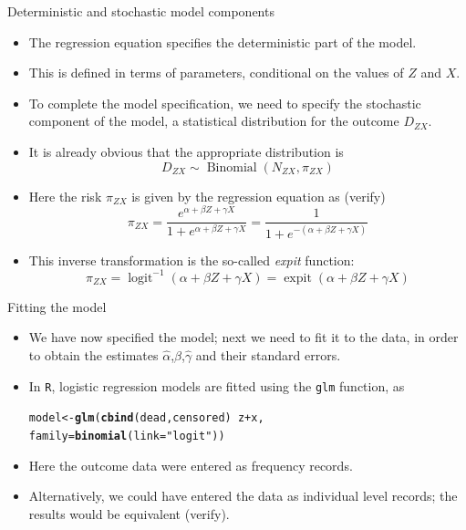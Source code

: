 \documentclass[10pt,handout]{beamer}\usepackage[]{graphicx}\usepackage[]{color}
\makeatletter
\newcommand{\hlstr}[1]{\textcolor[rgb]{0.192,0.494,0.8}{#1}}%
\newcommand{\hlopt}[1]{\textcolor[rgb]{0,0,0}{#1}}%
\newcommand{\hlstd}[1]{\textcolor[rgb]{0.345,0.345,0.345}{#1}}%
\newcommand{\hlkwb}[1]{\textcolor[rgb]{0.69,0.353,0.396}{#1}}%
\newcommand{\hlkwc}[1]{\textcolor[rgb]{0.333,0.667,0.333}{#1}}%
\newcommand{\hlkwd}[1]{\textcolor[rgb]{0.737,0.353,0.396}{\textbf{#1}}}%
\newenvironment{kframe}{%
 \def\at@end@of@kframe{}%
 \ifinner\ifhmode%
  \def\at@end@of@kframe{\end{minipage}}%
  \begin{minipage}{\columnwidth}%
 \fi\fi%
 \def\FrameCommand##1{\hskip\@totalleftmargin \hskip-\fboxsep
 \colorbox{shadecolor}{##1}\hskip-\fboxsep
     \hskip-\linewidth \hskip-\@totalleftmargin \hskip\columnwidth}%
 \MakeFramed {\advance\hsize-\width
   \@totalleftmargin\z@ \linewidth\hsize
   \@setminipage}}%
 {\par\unskip\endMakeFramed%
 \at@end@of@kframe}
\newenvironment{knitrout}{}{} %
\makeatother
\begin{document}
\begin{frame}{Deterministic and stochastic model components}
	\begin{itemize}
		\item 
		The regression equation specifies the deterministic part of the model.
		
		\item This is defined in terms of parameters, conditional on the values of $Z$ and $X$.
		
		\item To complete the model specification, we need to specify the stochastic component of the model, a statistical distribution for the outcome $D_{Z X}$. 
		\item It is already obvious that the appropriate distribution is
		$$
		D_{Z X} \sim \operatorname{Binomial}\left(N_{Z X}, \pi_{Z X}\right)
		$$
		\item Here the risk $\pi_{Z X}$ is given by the regression equation as (verify)
		$$
		\pi_{Z X}=\frac{e^{\alpha+\beta Z+\gamma X}}{1+e^{\alpha+\beta Z+\gamma X}}=\frac{1}{1+e^{-(\alpha+\beta Z+\gamma X)}}
		$$
		\item This inverse transformation is the so-called \textit{expit} function:
		$$
		\pi_{Z X}=\operatorname{logit}^{-1}(\alpha+\beta Z+\gamma X)=\operatorname{expit}(\alpha+\beta Z+\gamma X)
		$$
	\end{itemize}
\end{frame}



\begin{frame}[fragile]{Fitting the model}
\begin{itemize}
	\item We have now specified the model; next we need to fit it to the data, in order to obtain the estimates $\hat{\alpha}$,$\hat{\beta}$,$\hat{\gamma}$ and	their standard errors.
	\item In \texttt{R}, logistic regression models are fitted using the \texttt{glm} function, as
\begin{knitrout}
\color{fgcolor}\begin{kframe}
\begin{alltt}
\hlstd{model} \hlkwb{<-} \hlkwd{glm}\hlstd{(}\hlkwd{cbind}\hlstd{(dead,censored)} \hlopt{~} \hlstd{z} \hlopt{+} \hlstd{x,}
               \hlkwc{family}\hlstd{=}\hlkwd{binomial}\hlstd{(}\hlkwc{link}\hlstd{=}\hlstr{"logit"}\hlstd{))}
\end{alltt}
\end{kframe}
\end{knitrout}
	\item Here the outcome data were entered as frequency records.
	\item Alternatively, we could have entered the data as individual level records; the results would be equivalent (verify).
\end{itemize}
\end{frame}
\end{document}

